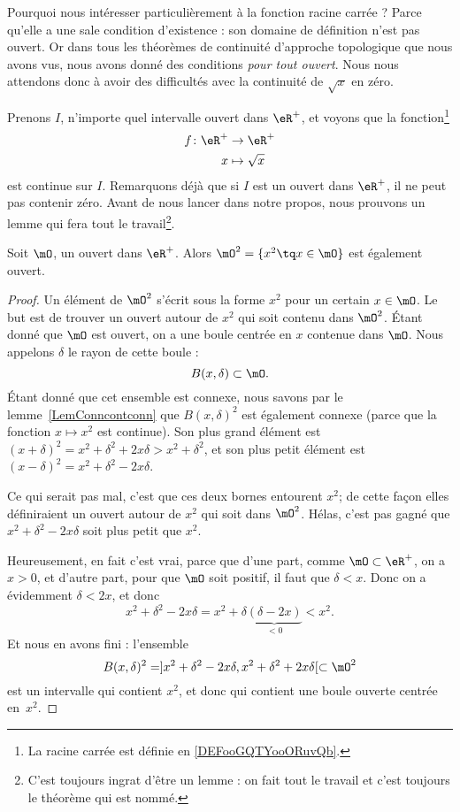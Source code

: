 Pourquoi nous intéresser particulièrement à la fonction racine carrée ? Parce qu'elle a une sale condition d'existence : son domaine de définition n'est pas ouvert. Or dans tous les théorèmes de continuité d'approche topologique que nous avons vus, nous avons donné des conditions \emph{pour tout ouvert}. Nous nous attendons donc à avoir des difficultés avec la continuité de \( \sqrt{x}\) en zéro.

Prenons \( I\), n'importe quel intervalle ouvert dans \( \eR^+\), et voyons que la fonction\footnote{La racine carrée est définie en \ref{DEFooGQTYooORuvQb}.}
\begin{equation}
	\begin{aligned}
		f\colon \eR^+ & \to \eR^+        \\
		x             & \mapsto \sqrt{x}
	\end{aligned}
\end{equation}
est continue sur \( I\). Remarquons déjà que si \( I\) est un ouvert dans \( \eR^+\), il ne peut pas contenir zéro. Avant de nous lancer dans notre propos, nous prouvons un lemme qui fera tout le travail\footnote{C'est toujours ingrat d'être un lemme : on fait tout le travail et c'est toujours le théorème qui est nommé.}.

\begin{lemma}
	Soit \( \mO\), un ouvert dans \( \eR^+\). Alors \( \mO^2=\{ x^2\tq x\in\mO \}\) est également ouvert.
\end{lemma}

\begin{proof}
	Un élément de \( \mO^2\) s'écrit sous la forme \( x^2\) pour un certain \( x\in\mO\). Le but est de trouver un ouvert autour de \( x^2\) qui soit contenu dans \( \mO^2\). Étant donné que \( \mO\) est ouvert, on a une boule centrée en \( x\) contenue dans \( \mO\). Nous appelons \( \delta\) le rayon de cette boule :
	\[
		B(x,\delta)\subset\mO.
	\]
	Étant donné que cet ensemble est connexe, nous savons par le lemme~\ref{LemConncontconn} que \( B(x,\delta)^2\) est également connexe (parce que la fonction \( x\mapsto x^2\) est continue). Son plus grand élément est \( (x+\delta)^2=x^2+\delta^2+2x\delta>x^2+\delta^2\), et son plus petit élément est \( (x-\delta)^2=x^2+\delta^2-2x\delta\).

	Ce qui serait pas mal, c'est que ces deux bornes entourent \( x^2\); de cette façon elles définiraient un ouvert autour de \( x^2\) qui soit dans \( \mO^2\). Hélas, c'est pas gagné que \( x^2+\delta^2-2x\delta\) soit plus petit que \( x^2\).

	Heureusement, en fait c'est vrai, parce que d'une part, comme \( \mO\subset\eR^+\), on a \( x>0\), et d'autre part, pour que \( \mO\) soit positif, il faut que \( \delta<x\). Donc on a évidemment \( \delta<2x\), et donc
	\[
		x^2+\delta^2-2x\delta=x^2+\delta\underbrace{(\delta-2x)}_{<0}<x^2.
	\]
	Et nous en avons fini : l'ensemble
	\[
		B(x,\delta)^2=]x^2+\delta^2-2x\delta,x^2+\delta^2+2x\delta[\subset\mO^2
	\]
	est un intervalle qui contient \( x^2\), et donc qui contient une boule ouverte centrée en~\( x^2\).
\end{proof}

